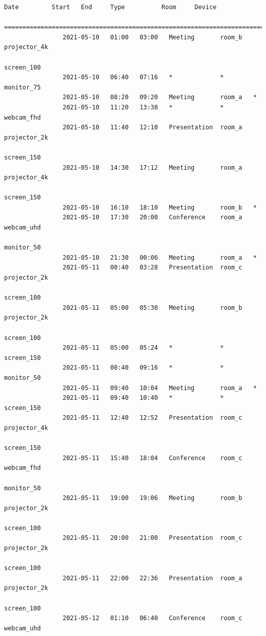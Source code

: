\documentclass{article}
\begin{document}
\begin{Verbatim}[gobble=8]
                Date         Start   End     Type          Room     Device
                ===========================================================================
                2021-05-10   01:00   03:00   Meeting       room_b   projector_4k
                                                                    screen_100
                2021-05-10   06:40   07:16   *             *        monitor_75
                2021-05-10   08:20   09:20   Meeting       room_a   *
                2021-05-10   11:20   13:38   *             *        webcam_fhd
                2021-05-10   11:40   12:10   Presentation  room_a   projector_2k
                                                                    screen_150
                2021-05-10   14:30   17:12   Meeting       room_a   projector_4k
                                                                    screen_150
                2021-05-10   16:10   18:10   Meeting       room_b   *
                2021-05-10   17:30   20:00   Conference    room_a   webcam_uhd
                                                                    monitor_50
                2021-05-10   21:30   00:06   Meeting       room_a   *
                2021-05-11   00:40   03:28   Presentation  room_c   projector_2k
                                                                    screen_100
                2021-05-11   05:00   05:30   Meeting       room_b   projector_2k
                                                                    screen_100
                2021-05-11   05:00   05:24   *             *        screen_150
                2021-05-11   08:40   09:16   *             *        monitor_50
                2021-05-11   09:40   10:04   Meeting       room_a   *
                2021-05-11   09:40   10:40   *             *        screen_150
                2021-05-11   12:40   12:52   Presentation  room_c   projector_4k
                                                                    screen_150
                2021-05-11   15:40   18:04   Conference    room_c   webcam_fhd
                                                                    monitor_50
                2021-05-11   19:00   19:06   Meeting       room_b   projector_2k
                                                                    screen_100
                2021-05-11   20:00   21:00   Presentation  room_c   projector_2k
                                                                    screen_100
                2021-05-11   22:00   22:36   Presentation  room_a   projector_2k
                                                                    screen_100
                2021-05-12   01:10   06:40   Conference    room_c   webcam_uhd

\end{Verbatim}
\end{document}
